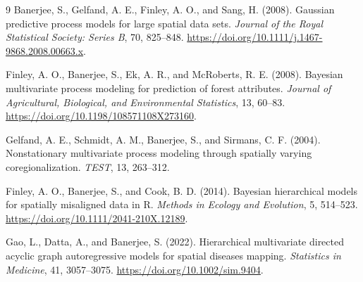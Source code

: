 \documentclass[11pt]{article}
\begin{document}
\begin{thebibliography}{9}
Banerjee, S., Gelfand, A. E., Finley, A. O., and Sang, H. (2008).
Gaussian predictive process models for large spatial data sets.
\emph{Journal of the Royal Statistical Society: Series B}, 70, 825--848.
\url{https://doi.org/10.1111/j.1467-9868.2008.00663.x}.

Finley, A. O., Banerjee, S., Ek, A. R., and McRoberts, R. E. (2008).
Bayesian multivariate process modeling for prediction of forest attributes.
\emph{Journal of Agricultural, Biological, and Environmental Statistics},
13, 60--83. \url{https://doi.org/10.1198/108571108X273160}.

Gelfand, A. E., Schmidt, A. M., Banerjee, S., and Sirmans, C. F. (2004).
Nonstationary multivariate process modeling through spatially varying
coregionalization. \emph{TEST}, 13, 263--312.

Finley, A. O., Banerjee, S., and Cook, B. D. (2014).
Bayesian hierarchical models for spatially misaligned data in R.
\emph{Methods in Ecology and Evolution}, 5, 514--523.
\url{https://doi.org/10.1111/2041-210X.12189}.

Gao, L., Datta, A., and Banerjee, S. (2022).
Hierarchical multivariate directed acyclic graph autoregressive models for spatial
diseases mapping. \emph{Statistics in Medicine}, 41, 3057--3075.
\url{https://doi.org/10.1002/sim.9404}.
\end{thebibliography}
\end{document}
